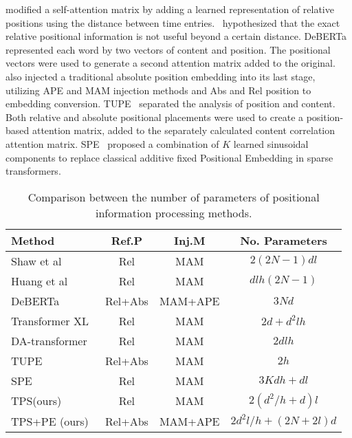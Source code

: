 \documentclass[journal]{IEEEtran}
\begin{document}
\cite{shaw_self-attention_2018} modified a self-attention matrix by adding a learned representation of relative positions using the distance between time entries.~\cite{shaw_self-attention_2018} hypothesized that the exact relative positional information is not useful beyond a certain distance.
DeBERTa~\cite{he2021deberta} represented each word by two vectors of content and position. The positional vectors were used to generate a second attention matrix added to the original.~\cite{he2021deberta} also injected a traditional absolute position embedding into its last stage, utilizing APE and MAM injection methods and Abs and Rel position to embedding conversion. TUPE~\cite{ke_rethinking_2021} separated the analysis of position and content. Both relative and absolute positional placements were used to create a position-based attention matrix, added to the separately calculated content correlation attention matrix. SPE~\cite{pmlr-v139-liutkus21a} proposed a combination of $K$ learned sinusoidal components to replace classical additive fixed Positional Embedding in sparse transformers.
\begin{table}[!t]
\setlength{\tabcolsep}{4pt}
\centering
  \caption{Comparison between the number of parameters of positional information processing methods.}
\begin{tabular}{l|ccc}
\toprule
Method & Ref.P & Inj.M & No. Parameters \\
\midrule
Shaw et al~\cite{shaw_self-attention_2018} & Rel & MAM & \(2(2N − 1)dl\)  \\
Huang et al~\cite{huang-etal-2020-improve} & Rel & MAM & \(dlh(2N − 1)\)  \\
DeBERTa~\cite{he2021deberta} & Rel+Abs & MAM+APE & \(3Nd\)  \\
Transformer XL~\cite{dai-etal-2019-transformer} & Rel & MAM & \(2d + d^2 lh\)  \\
DA-transformer~\cite{wu_da-transformer_2021} & Rel & MAM & \(2dlh\)  \\
TUPE~\cite{ke_rethinking_2021} & Rel+Abs & MAM & \(2h\)  \\
SPE~\cite{pmlr-v139-liutkus21a} & Rel & MAM & \(3Kdh + dl\)  \\
TPS(ours) & Rel & MAM & \(2(d^2/h + d)l\)  \\
TPS+PE (ours) & Rel+Abs & MAM+APE & \(2d^2l/h + (2N+2l)d\)  \\
\bottomrule
\end{tabular}


  \label{tb:nop}
 \end{table}
 
\end{document}
